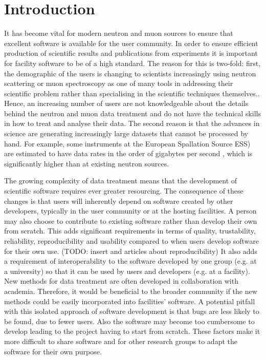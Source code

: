 \documentclass[jnr]{iosart2x}
\begin{document}
\begin{frontmatter}
\begin{keyword}
\end{keyword}

\end{frontmatter}

\newpage

\section{Introduction}
\label{Introduction}

It has become vital for modern neutron and muon sources to ensure that excellent software is available for the user community.
In order to ensure efficient production of scientific results and publications from experiments it is important for facility software to be of a high standard.
The reason for this is two-fold: first, the demographic of the users is changing to scientists increasingly using neutron scattering or muon spectroscopy as one of many tools in addressing their scientific problem rather than specialising in the scientific techniques themselves..
Hence, an increasing number of users are not knowledgeable about the details behind the neutron and muon data treatment and  do not have the technical skills in how to treat and analyse their data.
The second reason is that the advances in science are generating increasingly large datasets that cannot be processed by hand.
For example, some instruments at the European Spallation Source ESS) are estimated to have data rates in the order of gigabytes per second \cite{Christensen_2018}, which is significantly higher than at existing neutron sources.

The growing complexity of data treatment means that the development of scientific software requires ever greater resourcing.
The consequence of these changes is that users will inherently depend on software created by other developers, typically in the user community or at the hosting facilities.
A person may also choose to contribute to existing software rather than develop their own from scratch.
This adds significant requirements in terms of quality, trustability, reliability, reproducibility and usability compared to when users develop software for their own use.
(TODO: insert \cite{computational-science-error} and articles about reproducibility)
It also adds a requirement of interoperability to the software developed by one group (e.g. at a university) so that it can be used by users and developers (e.g. at a facility).
New methods for data treatment are often developed in collaboration with academia.
Therefore, it would be beneficial to the broader community if the new methods could be easily incorporated into facilities' software.
A potential pitfall with this isolated approach of software development is that bugs are less likely to be found, due to fewer users.
Also the software may become too cumbersome to develop leading to the project having to start from scratch.
These factors make it more difficult to share software and for other research groups to adapt the software for their own purpose.
\end{document}
